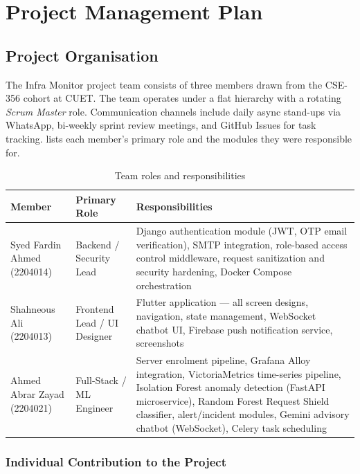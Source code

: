 \chapter{Project Management Plan}\label{ch:pm}

\section{Project Organisation}

The Infra Monitor project team consists of three members drawn from the
CSE-356 cohort at CUET.  The team operates under a flat hierarchy with a
rotating \textit{Scrum Master} role.  Communication channels include
daily async stand-ups via WhatsApp, bi-weekly sprint review meetings, and
GitHub Issues for task tracking.   lists each member's
primary role and the modules they were responsible for.

\begin{table}[H]
\centering
\caption{Team roles and responsibilities}\label{tab:roles}
\begin{tabularx}{\textwidth}{@{}>{\raggedright\arraybackslash}p{3.4cm} >{\raggedright\arraybackslash}p{2.8cm} >{\raggedright\arraybackslash}X@{}}
\toprule
\textbf{Member} & \textbf{Primary Role} & \textbf{Responsibilities}\\
\midrule
Syed Fardin Ahmed (2204014) & Backend / Security Lead &
  Django authentication module (JWT, OTP email verification), SMTP integration,
  role-based access control middleware, request sanitization and security hardening,
  Docker Compose orchestration\\
Shahneous Ali (2204013) & Frontend Lead / UI Designer &
  Flutter application --- all screen designs, navigation, state management,
  WebSocket chatbot UI, Firebase push notification service, screenshots\\
Ahmed Abrar Zayad (2204021) & Full-Stack / ML Engineer &
  Server enrolment pipeline, Grafana Alloy integration, VictoriaMetrics
  time-series pipeline, Isolation Forest anomaly detection (FastAPI microservice),
  Random Forest Request Shield classifier, alert/incident modules,
  Gemini advisory chatbot (WebSocket), Celery task scheduling\\
\bottomrule
\end{tabularx}
\end{table}

\subsection{Individual Contribution to the Project}

